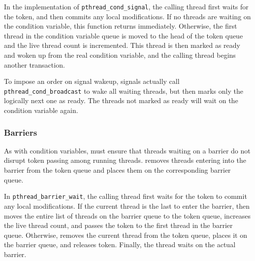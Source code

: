 
In the \dthreads{} implementation of \texttt{pthread\_cond\_signal},
the calling thread first waits for the token, and then commits any
local modifications.  If no threads are waiting on the condition
variable, this function returns immediately.  Otherwise, the first
thread in the condition variable queue is moved to the head of the
token queue and the live thread count is incremented.  This thread is
then marked as ready and woken up from the real condition variable,
and the calling thread begins another transaction.

To impose an order on signal wakeup, \dthreads{} signals
actually call 
\texttt{pthread\_cond\_broadcast} to wake all waiting threads, but then marks only
the logically next one as ready.  The threads not marked as
ready will wait on the condition variable again.

\subsubsection{Barriers}

\label{sec:barrierwait}

As with condition variables, \dthreads{} must ensure that threads
waiting on a barrier do not disrupt token passing among running
threads. \dthreads{} removes threads entering into the barrier from
the token queue and places them on the corresponding barrier queue.

In \texttt{pthread\_barrier\_wait}, the calling thread first waits for
the token to commit any local modifications. If the current thread is
the last to enter the barrier, then \dthreads{} moves the entire list
of threads on the barrier queue to the token queue, increases the
live thread count, and passes the token to the first thread in the
barrier queue.  Otherwise, \dthreads{} removes the current thread from
the token queue, places it on the barrier queue, and releases
token. Finally, the thread waits on the actual \pthreads{} barrier.

